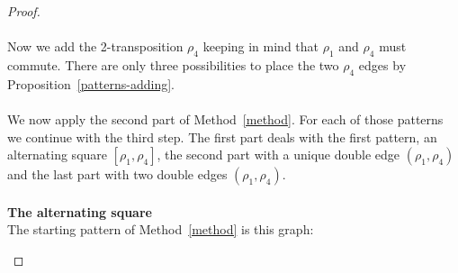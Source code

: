 \begin{proof}
\paragraph{}
Now we add the 2-transposition $\rho_4$ keeping in mind that $\rho_1$ and $\rho_4$ must commute. There are only three possibilities to place the two $\rho_4$ edges by Proposition~\ref{patterns-adding}.

\paragraph{}
We now apply the second part of Method~\ref{method}. For each of those patterns we continue with the third step. The first part deals with the first pattern, an alternating square $[\rho_1, \rho_4]$, the second part with a unique double edge $(\rho_1, \rho_4)$ and the last part with two double edges $(\rho_1, \rho_4)$.

\paragraph{}
\textbf{The alternating square}\\
The starting pattern of Method~\ref{method} is this graph:

\begin{figure}[H]
  \begin{center}
\end{center}
\end{figure}
\end{proof}
